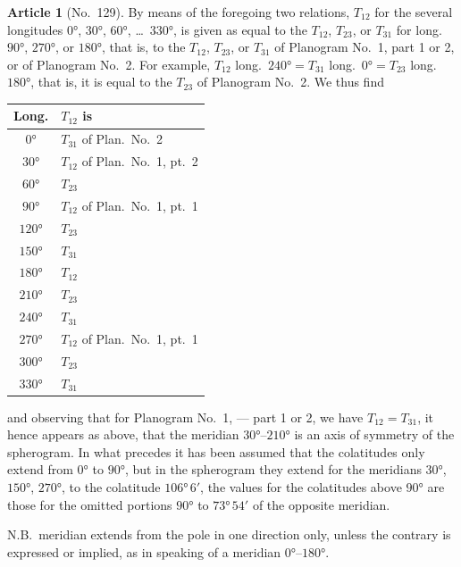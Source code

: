 \documentclass[11pt,a4paper]{article}
\theoremstyle{definition}
\newtheorem{art}{Article}
\begin{document}
\begin{art}[No.~129]
By means of the foregoing two relations, $T_{12}$ for the several longitudes $0°$, $30°$, $60°$, \dots\ $330°$, is given as equal to the $T_{12}$, $T_{23}$, or $T_{31}$ for long.~$90°$, $270°$, or $180°$, that is, to the $T_{12}$, $T_{23}$, or $T_{31}$ of Planogram No.~1, part 1 or 2, or of Planogram No.~2. For example, $T_{12}$ long.~$240° = T_{31}$ long.~$0° = T_{23}$ long.~$180°$, that is, it is equal to the $T_{23}$ of Planogram No.~2. We thus find
\begin{center}
\begin{tabular}{c|l}
Long. & $T_{12}$ is \\
\hline
$0°$ & $T_{31}$ of Plan.~No.~2 \\
$30°$ & $T_{12}$ of Plan.~No.~1, pt.~2 \\
$60°$ & $T_{23}$ \,\,\,\,\,\,\,\,\,\,\,\,\,\,\,\,\,\,\,\,\,\,\,\,\,\,\,\,\,\,\,\,\,\,\,\,\,\,\,\,\,\,\, \\
$90°$ & $T_{12}$ of Plan.~No.~1, pt.~1 \\
$120°$ & $T_{23}$ \,\,\,\,\,\,\,\,\,\,\,\,\,\,\,\,\,\,\,\,\,\,\,\,\,\,\,\,\,\,\,\,\,\,\,\,\,\,\,\,\,\,\, \\
$150°$ & $T_{31}$ \,\,\,\,\,\,\,\,\,\,\,\,\,\,\,\,\,\,\,\,\,\,\,\,\,\,\,\,\,\,\,\,\,\,\,\,\,\,\,\,\,\,\, \\
$180°$ & $T_{12}$ \,\,\,\,\,\,\,\,\,\,\,\,\,\,\,\,\,\,\,\,\,\,\,\,\,\,\,\,\,\,\,\,\,\,\,\,\,\,\,\,\,\,\, \\
$210°$ & $T_{23}$ \,\,\,\,\,\,\,\,\,\,\,\,\,\,\,\,\,\,\,\,\,\,\,\,\,\,\,\,\,\,\,\,\,\,\,\,\,\,\,\,\,\,\, \\
$240°$ & $T_{31}$ \,\,\,\,\,\,\,\,\,\,\,\,\,\,\,\,\,\,\,\,\,\,\,\,\,\,\,\,\,\,\,\,\,\,\,\,\,\,\,\,\,\,\, \\
$270°$ & $T_{12}$ of Plan.~No.~1, pt.~1 \\
$300°$ & $T_{23}$ \,\,\,\,\,\,\,\,\,\,\,\,\,\,\,\,\,\,\,\,\,\,\,\,\,\,\,\,\,\,\,\,\,\,\,\,\,\,\,\,\,\,\, \\
$330°$ & $T_{31}$ \,\,\,\,\,\,\,\,\,\,\,\,\,\,\,\,\,\,\,\,\,\,\,\,\,\,\,\,\,\,\,\,\,\,\,\,\,\,\,\,\,\,\, \\
\end{tabular}
\end{center}
and observing that for Planogram No.~1, --- part 1 or 2, we have $T_{12} = T_{31}$, it hence appears as above, that the meridian $30°$--$210°$ is an axis of symmetry of the spherogram. In what precedes it has been assumed that the colatitudes only extend from $0°$ to $90°$, but in the spherogram they extend for the meridians $30°$, $150°$, $270°$, to the colatitude $106°\, 6'$, the values for the colatitudes above $90°$ are those for the omitted portions $90°$ to $73°\, 54'$ of the opposite meridian.

N.B.\ meridian extends from the pole in one direction only, unless the contrary is expressed or implied, as in speaking of a meridian $0°$--$180°$.
\end{art}
\end{document}
